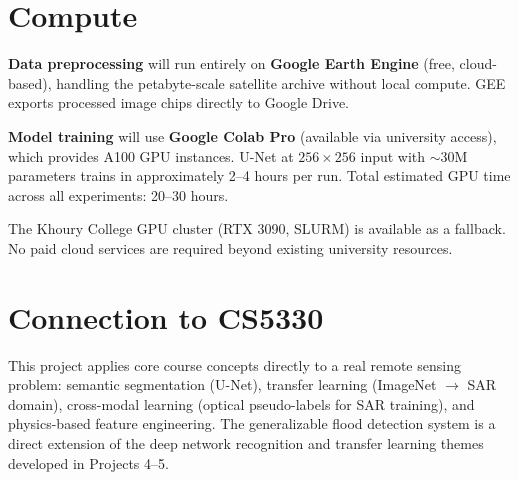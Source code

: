 \documentclass[11pt]{article}
\begin{document}
\section*{Compute}

\textbf{Data preprocessing} will run entirely on \textbf{Google Earth Engine} (free,
cloud-based), handling the petabyte-scale satellite archive without local compute.
GEE exports processed image chips directly to Google Drive.

\textbf{Model training} will use \textbf{Google Colab Pro} (available via university
access), which provides A100 GPU instances. U-Net at $256 \times 256$ input with
$\sim$30M parameters trains in approximately 2--4 hours per run. Total estimated GPU
time across all experiments: 20--30 hours.

The Khoury College GPU cluster (RTX 3090, SLURM) is available as a fallback.
No paid cloud services are required beyond existing university resources.

\section*{Connection to CS5330}

This project applies core course concepts directly to a real remote sensing problem:
semantic segmentation (U-Net), transfer learning (ImageNet $\to$ SAR domain),
cross-modal learning (optical pseudo-labels for SAR training), and physics-based
feature engineering. The generalizable flood detection system is a direct extension
of the deep network recognition and transfer learning themes developed in Projects 4--5.
\end{document}

